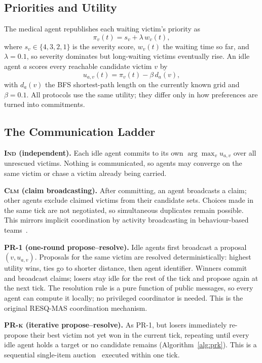 \documentclass[conference]{IEEEtran}
\newcommand{\IND}{\textsc{Ind}}
\newcommand{\CLM}{\textsc{Clm}}
\newcommand{\PRone}{\textsc{PR-1}}
\newcommand{\PRk}{\textsc{PR-k}}
\begin{document}
\subsection{Priorities and Utility}
The medical agent republishes each waiting victim's priority as
\begin{equation}
\pi_v(t) = s_v + \lambda\, w_v(t),
\label{eq:priority}
\end{equation}
where $s_v\in\{4,3,2,1\}$ is the severity score, $w_v(t)$ the waiting time so far, and $\lambda=0.1$, so severity dominates but long-waiting victims eventually rise. An idle agent $a$ scores every reachable candidate victim $v$ by
\begin{equation}
u_{a,v}(t) = \pi_v(t) - \beta\, d_a(v),
\label{eq:utility}
\end{equation}
with $d_a(v)$ the BFS shortest-path length on the currently known grid and $\beta=0.1$. All protocols use the same utility; they differ only in how preferences are turned into commitments.

\subsection{The Communication Ladder}
\textbf{\IND{} (independent).} Each idle agent commits to its own $\arg\max_v u_{a,v}$ over all unrescued victims. Nothing is communicated, so agents may converge on the same victim or chase a victim already being carried.

\textbf{\CLM{} (claim broadcasting).} After committing, an agent broadcasts a claim; other agents exclude claimed victims from their candidate sets. Choices made in the same tick are not negotiated, so simultaneous duplicates remain possible. This mirrors implicit coordination by activity broadcasting in behaviour-based teams~\cite{rizk2019}.

\textbf{\PRone{} (one-round propose--resolve).} Idle agents first broadcast a proposal $(v, u_{a,v})$. Proposals for the same victim are resolved deterministically: highest utility wins, ties go to shorter distance, then agent identifier. Winners commit and broadcast claims; losers stay idle for the rest of the tick and propose again at the next tick. The resolution rule is a pure function of public messages, so every agent can compute it locally; no privileged coordinator is needed. This is the original RESQ-MAS coordination mechanism.

\textbf{\PRk{} (iterative propose--resolve).} As \PRone{}, but losers immediately re-propose their best victim not yet won in the current tick, repeating until every idle agent holds a target or no candidate remains (Algorithm~\ref{alg:prk}). This is a sequential single-item auction~\cite{quinton2023} executed within one tick.
\end{document}
